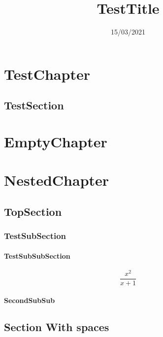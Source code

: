 \documentclass[]{report}
\title{TestTitle}
\date{15/03/2021}
\begin{document}
\chapter{TestChapter}
\section{TestSection}
\chapter{EmptyChapter}
\chapter{NestedChapter}
\section{TopSection}
\subsection{TestSubSection}
\subsubsection{TestSubSubSection}
\begin{equation}
    \frac{x^2}{x+1}
\end{equation}
\subsubsection{SecondSubSub}
\section{Section With spaces}
\end{document}
